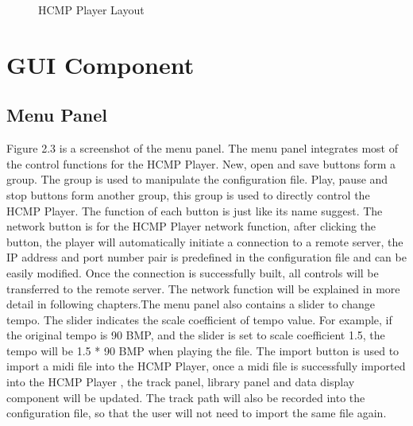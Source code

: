 \begin{figure}[H]
\caption{HCMP Player Layout}
\label{fig:speciation}
\end{figure}

\section{GUI Component}

\subsection{Menu Panel}

Figure 2.3 is a screenshot of the menu panel. The menu panel integrates most of the control 
functions for the HCMP Player. New, open and save buttons form a group. The group is used to 
manipulate the configuration file. Play, pause and stop buttons form another group, 
this group is used to directly control the HCMP Player. 
The function of each button is just like its name suggest. The network button 
is for the HCMP Player  
network function, after clicking the button, the player will automatically 
initiate a connection to a remote server, the IP address and port number pair is 
predefined in the configuration file and can be easily modified. Once the connection is 
successfully built, all controls will be transferred to the remote server. 
The network function will be explained in more detail in following
chapters.The menu panel also contains a slider to change 
tempo. The slider indicates the scale coefficient of tempo value. For example, 
if the original tempo is 90 BMP, and the slider is set to scale coefficient 1.5, 
the tempo will be 1.5 * 90 
BMP when playing the file. The import button is used to import a midi file 
into the HCMP Player, once a midi file is successfully imported into the HCMP Player  
, the track panel, library panel and data display component will be updated. 
The track path will also be recorded into the configuration file, so that the user 
will not need to import the same file again.

